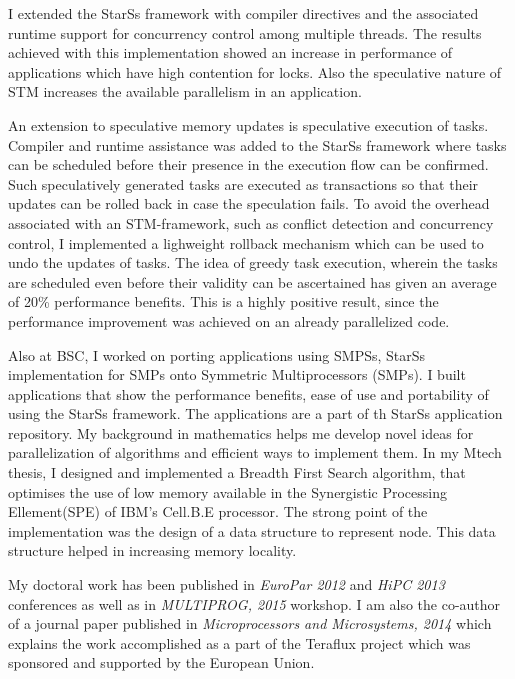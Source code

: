 \documentclass[10pt,stdletter,dateno]{newlfm}
\begin{document}
\begin{newlfm}
	   I extended the StarSs framework with compiler directives and the associated runtime support for concurrency control among multiple threads.
	   The results achieved with this implementation showed an increase in performance of applications which have high contention for locks.
	   Also the speculative nature of STM increases the available parallelism in an application.
%
	   \par
	   An extension to speculative memory updates is speculative execution of tasks.
	   Compiler and runtime assistance was added to the StarSs framework where tasks can be scheduled before their presence in the execution flow can be confirmed.
	   Such speculatively generated tasks are executed as transactions so that their updates can be rolled back in case the speculation fails.
	   To avoid the overhead associated with an STM-framework, such as conflict detection and concurrency control, I implemented a lighweight rollback mechanism which can be used to undo the updates of tasks.
	   The idea of greedy task execution, wherein the tasks are scheduled even before their validity can be ascertained has given an average of 20\% performance benefits.
	   This is a highly positive result, since the performance improvement was achieved on an already parallelized code.
%
	   \par
	   Also at BSC, I worked on porting applications using SMPSs, StarSs implementation for SMPs onto Symmetric Multiprocessors (SMPs).
	   I built applications that show the performance benefits, ease of use and portability of using the StarSs framework.
	   The applications are a part of th StarSs application repository.
	   My background in mathematics helps me develop novel ideas for parallelization of algorithms and efficient ways to implement them.
	   In my Mtech thesis, I designed and implemented a Breadth First Search algorithm, that optimises the use of low memory available in the Synergistic Processing Ellement(SPE) of IBM's Cell.B.E processor.
	   The strong point of the implementation was the design of a data structure to represent node. This data structure helped in increasing memory locality.
%
	   \par
	   My doctoral work has been published in \textit{EuroPar 2012} and \textit{HiPC 2013} conferences as well as in \textit{MULTIPROG, 2015} workshop.
	   I am also the co-author of a journal paper published in \textit{Microprocessors and Microsystems, 2014} which explains the work accomplished as a part of the Teraflux project which was sponsored and supported by the European Union.

\end{newlfm}
\end{document}
